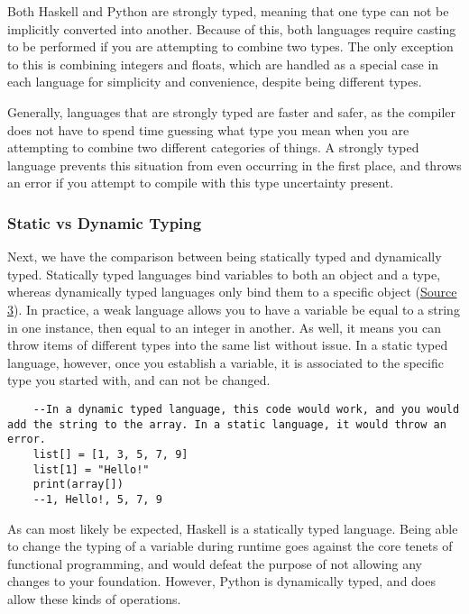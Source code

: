 \documentclass{article}
\begin{document}
    \medskip\noindent Both Haskell and Python are strongly typed, meaning that one type can not be implicitly converted into another. Because of this, both languages require casting to be performed if you are attempting to combine two types. The only exception to this is combining integers and floats, which are handled as a special case in each language for simplicity and convenience, despite being different types. 
    
    \medskip\noindent Generally, languages that are strongly typed are faster and safer, as the compiler does not have to spend time guessing what type you mean when you are attempting to combine two different categories of things. A strongly typed language prevents this situation from even occurring in the first place, and throws an error if you attempt to compile with this type uncertainty present. 
    
    \subsubsection{Static vs Dynamic Typing}
    \medskip\noindent Next, we have the comparison between being statically typed and dynamically typed. Statically typed languages bind variables to both an object and a type, whereas dynamically typed languages only bind them to a specific object (\href{https://pythonconquerstheuniverse.wordpress.com/2009/10/03/static-vs-dynamic-typing-of-programming-languages/} {Source 3}). In practice, a weak language allows you to have a variable be equal to a string in one instance, then equal to an integer in another. As well, it means you can throw items of different types into the same list without issue. In a static typed language, however, once you establish a variable, it is associated to the specific type you started with, and can not be changed. 
    
       \begin{lstlisting}
    --In a dynamic typed language, this code would work, and you would add the string to the array. In a static language, it would throw an error. 
    list[] = [1, 3, 5, 7, 9]
    list[1] = "Hello!"
    print(array[])
    --1, Hello!, 5, 7, 9
    \end{lstlisting}
    
    \medskip\noindent As can most likely be expected, Haskell is a statically typed language. Being able to change the typing of a variable during runtime goes against the core tenets of functional programming, and would defeat the purpose of not allowing any changes to your foundation. However, Python is dynamically typed, and does allow these kinds of operations. 
    
\end{document}
